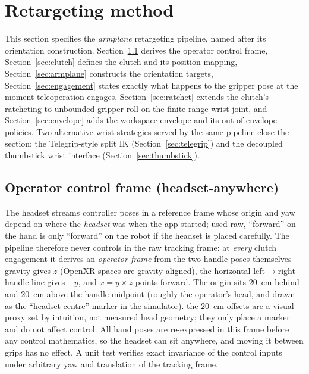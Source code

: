 \section{Retargeting method}
\label{sec:method}

This section specifies the \emph{armplane} retargeting pipeline, named
after its orientation construction. Section~\ref{sec:opframe} derives
the operator control frame, Section~\ref{sec:clutch} defines the clutch
and its position mapping, Section~\ref{sec:armplane} constructs the
orientation targets, Section~\ref{sec:engagement} states exactly what
happens to the gripper pose at the moment teleoperation engages,
Section~\ref{sec:ratchet} extends the clutch's ratcheting to unbounded
gripper roll on the finite-range wrist joint, and
Section~\ref{sec:envelope} adds the workspace envelope and its
out-of-envelope policies. Two alternative wrist strategies served by the
same pipeline close the section: the Telegrip-style split IK
(Section~\ref{sec:telegrip}) and the decoupled thumbstick wrist
interface (Section~\ref{sec:thumbstick}).

\subsection{Operator control frame (headset-anywhere)}
\label{sec:opframe}

The headset streams controller poses in a reference frame whose origin
and yaw depend on where the \emph{headset} was when the app started;
used raw, ``forward'' on the hand is only ``forward'' on the robot if
the headset is placed carefully. The pipeline therefore never controls
in the raw tracking frame: at \emph{every} clutch engagement it derives
an \emph{operator frame} from the two handle poses themselves~---
gravity gives \(z\) (OpenXR spaces are gravity-aligned), the horizontal
left\(\to\)right handle line gives \(-y\), and \(x = y \times z\) points
forward. The origin sits \SI{20}{cm} behind and \SI{20}{cm} above the
handle midpoint (roughly the operator's head, and drawn as the ``headset
centre'' marker in the simulator).
\unjustified{} the \SI{20}{cm} offsets are a visual proxy
set by intuition, not measured head geometry; they only place a marker
and do not affect control. All hand poses are re-expressed in this frame
before any control mathematics, so the headset can sit anywhere, and
moving it between grips has no effect. A unit test verifies exact
invariance of the control inputs under arbitrary yaw and translation of
the tracking frame.

